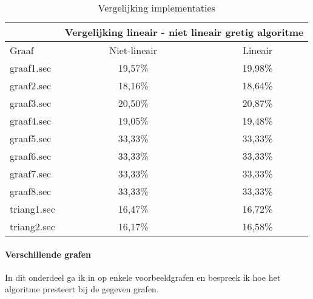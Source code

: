 \documentclass[11pt, a4paper, table]{article}
\theoremstyle{definition}
\begin{document}
\begin{table}
	\centering
	\begin{tabular}{|l|c|c|}
		\hline
		& \multicolumn{2}{c|}{Vergelijking lineair - niet lineair gretig algoritme}		\\ \hline
		Graaf & Niet-lineair  & Lineair 		\\ \hline
		graaf1.sec &  \cellcolor{LimeGreen}19,57\% & 19,98\%		\\ \hline
		graaf2.sec &  \cellcolor{LimeGreen}18,16\% & 18,64\%		\\ \hline
		graaf3.sec &  \cellcolor{LimeGreen}20,50\% & 20,87\%		\\ \hline
		graaf4.sec &  \cellcolor{LimeGreen}19,05\% & 19,48\%		\\ \hline
		graaf5.sec &  \cellcolor{LimeGreen}33,33\% & 33,33\%		\\ \hline
		graaf6.sec &  \cellcolor{LimeGreen}33,33\% & 33,33\%		\\ \hline
		graaf7.sec &  \cellcolor{LimeGreen}33,33\% & 33,33\%		\\ \hline
		graaf8.sec &  \cellcolor{LimeGreen}33,33\% & 33,33\%		\\ \hline
		triang1.sec &  \cellcolor{LimeGreen}16,47\% & 16,72\%		\\ \hline
		triang2.sec &  \cellcolor{LimeGreen}16,17\% & 16,58\%		\\ \hline
	\end{tabular}
	\caption{Vergelijking implementaties}
	\label{tabel:nonlinear}
\end{table}

\paragraph{Verschillende grafen}
In dit onderdeel ga ik in op enkele voorbeeldgrafen en bespreek ik hoe het algoritme presteert bij de gegeven grafen. 
\end{document}
